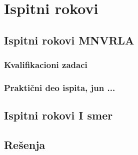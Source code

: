 \appendix
\chapter{Ispitni rokovi}

\section{Ispitni rokovi MNVRLA}
\subsection{Kvalifikacioni zadaci}

\subsection{Praktični deo ispita, jun ...}

\section{Ispitni rokovi I smer}



\section{Rešenja}
\shipoutAnswer
